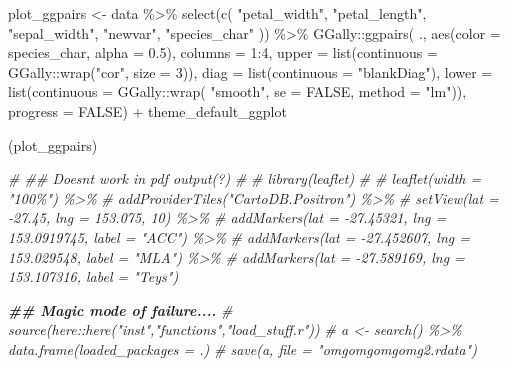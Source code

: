 \documentclass[]{elsarticle} %
\newenvironment{Shaded}{\begin{snugshade}}{\end{snugshade}}
\newcommand{\AttributeTok}[1]{\textcolor[rgb]{0.77,0.63,0.00}{#1}}
\newcommand{\CommentTok}[1]{\textcolor[rgb]{0.56,0.35,0.01}{\textit{#1}}}
\newcommand{\ConstantTok}[1]{\textcolor[rgb]{0.00,0.00,0.00}{#1}}
\newcommand{\DecValTok}[1]{\textcolor[rgb]{0.00,0.00,0.81}{#1}}
\newcommand{\DocumentationTok}[1]{\textcolor[rgb]{0.56,0.35,0.01}{\textbf{\textit{#1}}}}
\newcommand{\FloatTok}[1]{\textcolor[rgb]{0.00,0.00,0.81}{#1}}
\newcommand{\FunctionTok}[1]{\textcolor[rgb]{0.00,0.00,0.00}{#1}}
\newcommand{\NormalTok}[1]{#1}
\newcommand{\OtherTok}[1]{\textcolor[rgb]{0.56,0.35,0.01}{#1}}
\newcommand{\SpecialCharTok}[1]{\textcolor[rgb]{0.00,0.00,0.00}{#1}}
\newcommand{\StringTok}[1]{\textcolor[rgb]{0.31,0.60,0.02}{#1}}
\begin{document}
\begin{Shaded}
\begin{Highlighting}[]
\NormalTok{plot\_ggpairs }\OtherTok{\textless{}{-}} 
\NormalTok{  data }\SpecialCharTok{\%\textgreater{}\%}
    \FunctionTok{select}\NormalTok{(}\FunctionTok{c}\NormalTok{(}
      \StringTok{"petal\_width"}\NormalTok{,  }\StringTok{"petal\_length"}\NormalTok{, }\StringTok{"sepal\_width"}\NormalTok{, }\StringTok{"newvar"}\NormalTok{, }\StringTok{"species\_char"}
\NormalTok{    )) }\SpecialCharTok{\%\textgreater{}\%}
\NormalTok{    GGally}\SpecialCharTok{::}\FunctionTok{ggpairs}\NormalTok{( .,  }
             \FunctionTok{aes}\NormalTok{(}\AttributeTok{color =}\NormalTok{ species\_char, }\AttributeTok{alpha =} \FloatTok{0.5}\NormalTok{),}
             \AttributeTok{columns =} \DecValTok{1}\SpecialCharTok{:}\DecValTok{4}\NormalTok{,}
             \AttributeTok{upper =} \FunctionTok{list}\NormalTok{(}\AttributeTok{continuous =}\NormalTok{ GGally}\SpecialCharTok{::}\FunctionTok{wrap}\NormalTok{(}\StringTok{"cor"}\NormalTok{, }\AttributeTok{size =} \DecValTok{3}\NormalTok{)),}
             \AttributeTok{diag =}  \FunctionTok{list}\NormalTok{(}\AttributeTok{continuous =} \StringTok{"blankDiag"}\NormalTok{),}
             \AttributeTok{lower =} \FunctionTok{list}\NormalTok{(}\AttributeTok{continuous =}\NormalTok{ GGally}\SpecialCharTok{::}\FunctionTok{wrap}\NormalTok{( }\StringTok{"smooth"}\NormalTok{, }
                                                     \AttributeTok{se =} \ConstantTok{FALSE}\NormalTok{, }
                                                     \AttributeTok{method =} \StringTok{"lm"}\NormalTok{)),}
             \AttributeTok{progress =} \ConstantTok{FALSE}\NormalTok{) }\SpecialCharTok{+}
\NormalTok{      theme\_default\_ggplot}


\NormalTok{(plot\_ggpairs)}


\CommentTok{\# \#\# Doesn\textquotesingle{}t work in pdf output(?)}
\CommentTok{\# }
\CommentTok{\# library(leaflet)}
\CommentTok{\# }
\CommentTok{\# leaflet(width = "100\%") \%\textgreater{}\%}
\CommentTok{\#   addProviderTiles("CartoDB.Positron") \%\textgreater{}\%}
\CommentTok{\#   setView(lat = {-}27.45, lng = 153.075, 10) \%\textgreater{}\%}
\CommentTok{\#   addMarkers(lat = {-}27.45321, lng = 153.0919745, label = "ACC") \%\textgreater{}\%}
\CommentTok{\#   addMarkers(lat = {-}27.452607, lng = 153.029548, label = "MLA") \%\textgreater{}\%}
\CommentTok{\#   addMarkers(lat = {-}27.589169, lng = 153.107316, label = "Teys")}

\DocumentationTok{\#\# Magic mode of failure.... }
\CommentTok{\# source(here::here("inst","functions","load\_stuff.r"))}
\CommentTok{\# a \textless{}{-} search() \%\textgreater{}\% data.frame(loaded\_packages = .) }
\CommentTok{\# save(a, file = "omgomgomgomg2.rdata")}


\end{Highlighting}
\end{Shaded}
\end{document}
